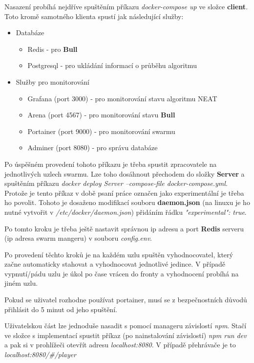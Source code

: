 Nasazení probíhá nejdříve spuštěním příkazu \emph{docker-compose up} ve složce \textbf{client}. Toto kromě samotného klienta spustí jak následující služby:
\begin{itemize}
	\item Databáze
	\begin{itemize}
		\item Redis - pro \textbf{Bull}
		\item Postgresql - pro ukládání informací o průběhu algoritmu
	\end{itemize}
	\item Služby pro monitorování
	\begin{itemize}
		\item Grafana (port 3000) - pro monitorování stavu algoritmu NEAT
		\item Arena (port 4567) - pro monitorování stavu \textbf{Bull}
		\item Portainer (port 9000) - pro monitorování swarmu
		\item Adminer (port 8080) - pro správu databáze
	\end{itemize}
\end{itemize}
Po úspěšném provedení tohoto příkazu je třeba spustit zpracovatele na jednotlivých uzlech swarmu. Lze toho dosáhnout přechodem do složky \textbf{Server} a spuštěním příkazu \emph{docker deploy Server --compose-file docker-compose.yml}. Protože je tento příkaz v době psaní práce označen jako experimentální je třeba ho povolit. Tohoto je dosaženo modifikací souboru \textbf{daemon.json} (na linuxu je ho nutné vytvořit v \emph{/etc/docker/daemon.json}) přidáním řádku \emph{"experimental": true}.

Po tomto kroku je třeba ještě nastavit správnou ip adresu a port \textbf{Redis} serveru (ip adresa swarm mangeru) v souboru \emph{config.env}.

Po provedení těchto kroků je na každém uzlu spuštěn vyhodnocovatel, který začne automaticky stahovat a vyhodnocovat jednotlivé jedince. V případě vypnutí/pádu uzlu je úkol po čase vrácen do fronty a vyhodnocení probíhá na jiném uzlu.

Pokud se uživatel rozhodne používat portainer, musí se z bezpečnostních důvodů přihlásit do 5 minut od jeho spuštění.

Uživatelskou část lze jednoduše nasadit s pomocí manageru závislostí \emph{npm}. Stačí ve složce s implementací spustit příkaz (po nainstalování závislostí) \emph{npm run dev} a pak si v prohlížeči otevřít adresu \emph{localhost:8080}. V případě přehrávače je to \emph{localhost:8080/\#/player}

